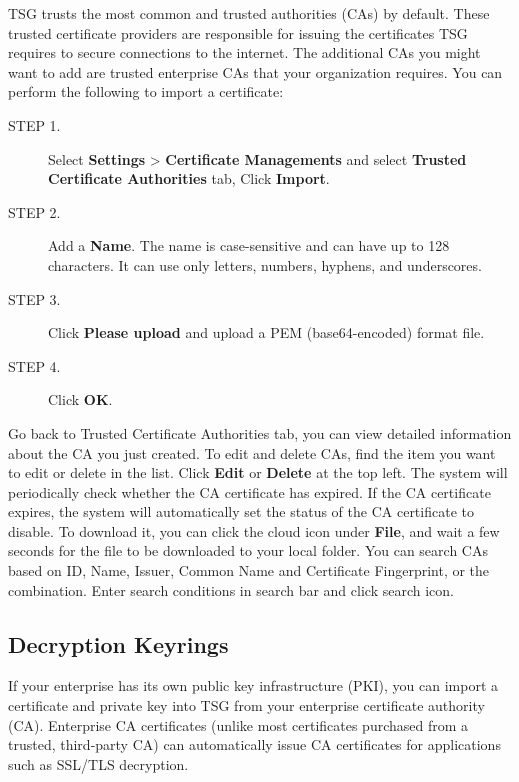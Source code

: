 TSG trusts the most common and trusted authorities (CAs) by default. These trusted certificate providers are responsible for issuing the certificates TSG requires to secure connections to the internet. The additional CAs you might want to add are trusted enterprise CAs that your organization requires. You can perform the following to import a certificate:

\begin{description}
    \item[STEP 1.]	Select \textbf{Settings} > \textbf{Certificate Managements} and select \textbf{Trusted Certificate Authorities} tab, Click \textbf{Import}.
    \item[STEP 2.]	Add a \textbf{Name}. The name is case-sensitive and can have up to 128 characters. It can use only letters, numbers, hyphens, and underscores.
    \item[STEP 3.]	Click \textbf{Please upload} and upload a PEM (base64-encoded) format file.
    \item[STEP 4.]	Click \textbf{OK}.    
\end{description}

Go back to Trusted Certificate Authorities tab, you can view detailed information about the CA you just created. 
To edit and delete CAs, find the item you want to edit or delete in the list. Click \textbf{Edit} or \textbf{Delete} at the top left. 
The system will periodically check whether the CA certificate has expired. 
If the CA certificate expires, the system will automatically set the status of the CA certificate to disable. 
To download it, you can click the cloud icon under \textbf{File}, and wait a few seconds for the file to be downloaded to your local folder. 
You can search CAs based on ID, Name, Issuer, Common Name and Certificate Fingerprint, or the combination. Enter search conditions in search bar and click search icon.

\subsection*{\hypertarget{link:Decryption Keyrings}{Decryption Keyrings}}
\label{sec:decrypt:certificate:keyring}

If your enterprise has its own public key infrastructure (PKI), you can import a certificate and private key into TSG from your enterprise certificate authority (CA). Enterprise CA certificates (unlike most certificates purchased from a trusted, third-party CA) can automatically issue CA certificates for applications such as SSL/TLS decryption.


